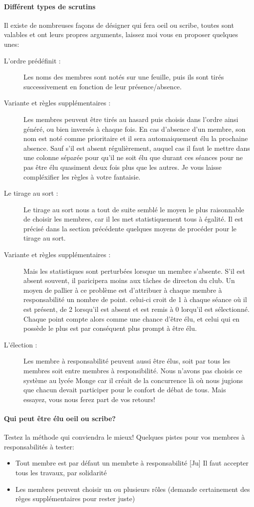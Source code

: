 \documentclass[a4paper,11pt]{article}
\begin{document}
\paragraph{Différent types de scrutins}
Il existe de nombreuses façons de désigner qui fera oeil ou scribe, toutes sont valables et ont leurs propres arguments, laissez moi vous en proposer quelques unes:
\begin{description}
 \item[L'ordre prédéfinit :] Les noms des membres sont notés sur une feuille, puis ils sont tirés successivement en fonction de leur présence/absence.
 \item[Variante et règles supplémentaires :] Les membres peuvent être tirés au hasard puis choisis dans l'ordre ainsi généré, ou bien inversés à chaque fois. En cas d'absence d'un membre, son nom est noté comme prioritaire et il sera automaiquement élu la prochaine absence. Sauf s'il est absent régulièrement, auquel cas il faut le mettre dans une colonne séparée pour qu'il ne soit élu que durant ces séances pour ne pas être élu quasiment deux fois plus que les autres. Je vous laisse compléxifier les règles à votre fantaisie.
 \item[Le tirage au sort :] Le tirage au sort nous a tout de suite semblé le moyen le plus raisonnable de choisir les membres, car il les met statistiquement tous à égalité. Il est précisé dans la section précédente quelques moyens de procéder pour le tirage au sort.
 \item[Variante et règles supplémentaires :] Mais les statistiques sont perturbées lorsque un membre s'absente. S'il est absent souvent, il paricipera moins aux tâches de directon du club. Un moyen de pallier à ce problème est d'attribuer à chaque membre à responsabilité un nombre de point. celui-ci croit de 1 à chaque séance où il est présent, de 2 lorsqu'il est absent et est remis à 0 lorqu'il est sélectionné. Chaque point compte alors comme une chance d'être élu, et celui qui en possède le plus est par conséquent plus prompt à être élu.
 \item[L'élection :] Les membre à responsabilité peuvent aussi être élus, soit par tous les membres soit entre membres à responsibilité. Nous n'avons pas choisis ce système au lycée Monge car il créait de la concurrence là où nous jugions que chacun devait participer pour le confort de débat de tous. Mais essayez, vous nous ferez part de vos retours!
\end{description}

\paragraph{Qui peut être élu oeil ou scribe?}
Testez la méthode qui conviendra le mieux! Quelques pistes pour vos membres à responsabilités à tester:
\begin{itemize}
 \item Tout membre est par défaut un membrte à responsabilité [Ju] Il faut accepter tous les travaux, par solidarité
 \item Les membres peuvent choisir un ou plusieurs rôles (demande certainement des rêges supplémentaires pour rester juste)
\end{itemize}
\end{document}
